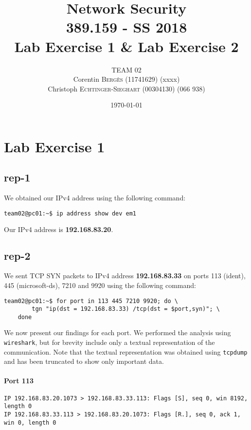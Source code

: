 \documentclass{article}
\title{Network Security \\ 389.159 - SS 2018 \\ Lab Exercise 1 \& Lab Exercise 2} %
\author{
    TEAM 02 \\
    Corentin \textsc{Bergès} (11741629) (xxxx) \\
    Christoph \textsc{Echtinger-Sieghart} (00304130) (066 938)
}
\date{\today} %
\begin{document}
\maketitle %

\renewcommand{\arraystretch}{2} %
\section{Lab Exercise 1}

\subsection{rep-1}

We obtained our IPv4 address using the following command:

\begin{Verbatim}
team02@pc01:~$ ip address show dev em1
\end{Verbatim}

Our IPv4 address is \textbf{192.168.83.20}.

\subsection{rep-2}

We sent TCP SYN packets to IPv4 address \textbf{192.168.83.33} on ports 113 (ident), 445 (microsoft-ds),
7210 and 9920 using the following command:

\begin{verbatim}
team02@pc01:~$ for port in 113 445 7210 9920; do \
        tgn "ip(dst = 192.168.83.33) /tcp(dst = $port,syn)"; \
    done
\end{verbatim}

We now present our findings for each port. We performed the analysis using \texttt{wireshark}, but for
brevity include only a textual representation of the communication. Note that the textual representation was
obtained using \texttt{tcpdump} and has been truncated to show only important data.

\paragraph{Port 113}
\begin{Verbatim}
IP 192.168.83.20.1073 > 192.168.83.33.113: Flags [S], seq 0, win 8192, length 0
IP 192.168.83.33.113 > 192.168.83.20.1073: Flags [R.], seq 0, ack 1, win 0, length 0
\end{Verbatim}
\end{document}
